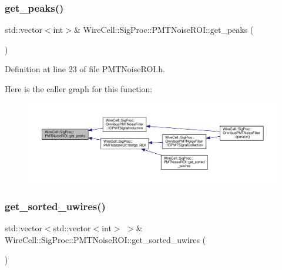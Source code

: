 \subsubsection{\texorpdfstring{get\+\_\+peaks()}{get\_peaks()}}
{\footnotesize\ttfamily std\+::vector$<$int$>$\& Wire\+Cell\+::\+Sig\+Proc\+::\+P\+M\+T\+Noise\+R\+O\+I\+::get\+\_\+peaks (\begin{DoxyParamCaption}{ }\end{DoxyParamCaption})\hspace{0.3cm}{\ttfamily [inline]}}



Definition at line 23 of file P\+M\+T\+Noise\+R\+O\+I.\+h.

Here is the caller graph for this function\+:
\nopagebreak
\begin{figure}[H]
\begin{center}
\leavevmode
\includegraphics[width=350pt]{class_wire_cell_1_1_sig_proc_1_1_p_m_t_noise_r_o_i_a55cdf5dad6e7476bbb73226876feb55f_icgraph}
\end{center}
\end{figure}
\mbox{\label{class_wire_cell_1_1_sig_proc_1_1_p_m_t_noise_r_o_i_ad037eeda9c0e6e50ad4a57d731cb8f56}} 
\subsubsection{\texorpdfstring{get\+\_\+sorted\+\_\+uwires()}{get\_sorted\_uwires()}}
{\footnotesize\ttfamily std\+::vector$<$std\+::vector$<$int$>$ $>$\& Wire\+Cell\+::\+Sig\+Proc\+::\+P\+M\+T\+Noise\+R\+O\+I\+::get\+\_\+sorted\+\_\+uwires (\begin{DoxyParamCaption}{ }\end{DoxyParamCaption})\hspace{0.3cm}{\ttfamily [inline]}}



